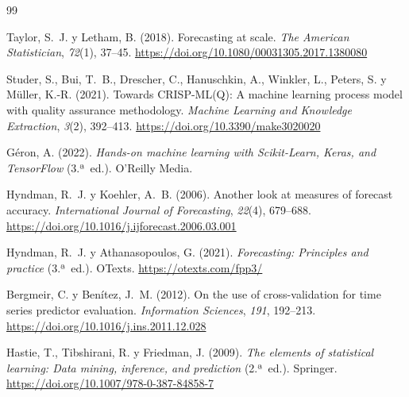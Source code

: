 \documentclass[11pt,a4paper]{article}
\begin{document}
\begingroup
\renewcommand{\section}[2]{}%
\begin{thebibliography}{99}

Taylor, S.~J. y Letham, B. (2018).
\newblock Forecasting at scale.
\newblock \emph{The American Statistician}, \emph{72}(1), 37--45.
\newblock \url{https://doi.org/10.1080/00031305.2017.1380080}

Studer, S., Bui, T.~B., Drescher, C., Hanuschkin, A., Winkler, L., Peters, S. y Müller, K.-R. (2021).
\newblock Towards CRISP-ML(Q): A machine learning process model with quality assurance methodology.
\newblock \emph{Machine Learning and Knowledge Extraction}, \emph{3}(2), 392--413.
\newblock \url{https://doi.org/10.3390/make3020020}

Géron, A. (2022).
\newblock \emph{Hands-on machine learning with Scikit-Learn, Keras, and TensorFlow} (3.ª~ed.).
\newblock O'Reilly Media.

Hyndman, R.~J. y Koehler, A.~B. (2006).
\newblock Another look at measures of forecast accuracy.
\newblock \emph{International Journal of Forecasting}, \emph{22}(4), 679--688.
\newblock \url{https://doi.org/10.1016/j.ijforecast.2006.03.001}

Hyndman, R.~J. y Athanasopoulos, G. (2021).
\newblock \emph{Forecasting: Principles and practice} (3.ª~ed.).
\newblock OTexts.
\newblock \url{https://otexts.com/fpp3/}

Bergmeir, C. y Benítez, J.~M. (2012).
\newblock On the use of cross-validation for time series predictor evaluation.
\newblock \emph{Information Sciences}, \emph{191}, 192--213.
\newblock \url{https://doi.org/10.1016/j.ins.2011.12.028}

Hastie, T., Tibshirani, R. y Friedman, J. (2009).
\newblock \emph{The elements of statistical learning: Data mining, inference, and prediction} (2.ª~ed.).
\newblock Springer.
\newblock \url{https://doi.org/10.1007/978-0-387-84858-7}


\end{thebibliography}
\end{document}
